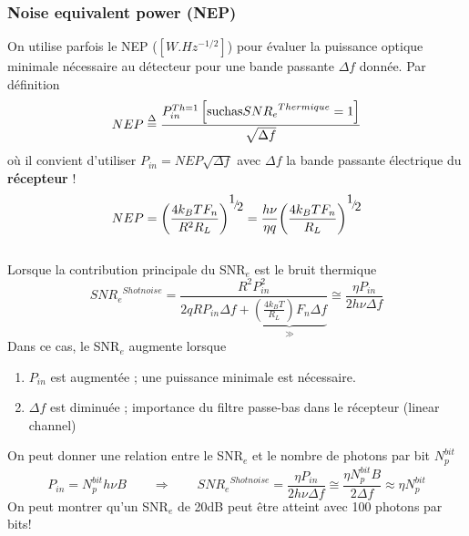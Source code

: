 \subsubsection{Noise equivalent power (NEP)}
On utilise parfois le NEP ($[W.Hz^{-1/2}]$) pour évaluer la puissance optique minimale nécessaire 
au détecteur pour une bande passante $\Delta f$ donnée. Par définition
\begin{equation}
NEP \buildrel \Delta \over = \frac{{P_{in}^{Th = 1}\left[ {{\rm{such as}}SN{R_e}^{Thermique} = 1} \right]}}{{\sqrt {\Delta f} }}
\end{equation}
où il convient d'utiliser $P_{in} = NEP\sqrt{\Delta f}$ avec $\Delta f$ la bande passante électrique
du \textbf{récepteur} !
\begin{equation}
NEP = {\left( {\frac{{4{k_B}T{F_n}}}{{{R^2}{R_L}}}} \right)^{{\raise0.7ex\hbox{$1$} \!\mathord{\left/
 {\vphantom {1 2}}\right.\kern-\nulldelimiterspace}
\!\lower0.7ex\hbox{$2$}}}} = \frac{{h\nu }}{{\eta q}}{\left( {\frac{{4{k_B}T{F_n}}}{{{R_L}}}} \right)^{{\raise0.7ex\hbox{$1$} \!\mathord{\left/
 {\vphantom {1 2}}\right.\kern-\nulldelimiterspace}
\!\lower0.7ex\hbox{$2$}}}}
\end{equation}\ \\

Lorsque la contribution principale du SNR$_e$ est le bruit thermique
\begin{equation}
SN{R_e}^{Shotnoise} = \frac{{{R^2}P_{in}^2}}{{2qR{P_{in}}\Delta f + \underbrace{\left(\frac{4k_BT}{R_L}\right)F_n\Delta f}_{\gg}}} \cong \frac{{\eta {P_{in}}}}{{2h\nu \Delta f}}
\end{equation}
Dans ce cas, le SNR$_e$ augmente lorsque
\begin{enumerate}
\item $P_{in}$ est augmentée ; une puissance minimale est nécessaire.
\item $\Delta f$ est diminuée ; importance du filtre passe-bas dans le récepteur (linear channel)
\end{enumerate}

On peut donner une relation entre le SNR$_e$ et le nombre de photons par bit $N_p^{bit}$
\begin{equation}
{P_{in}} = N_p^{bit}h\nu B\qquad\Rightarrow\qquad
SN{R_e}^{Shotnoise} = \frac{{\eta {P_{in}}}}{{2h\nu \Delta f}} \cong \frac{{\eta N_p^{bit}B}}{{2\Delta f}} \approx \eta N_p^{bit}
\end{equation}
On peut montrer qu'un SNR$_e$ de 20dB peut être atteint avec 100 photons par bits!



